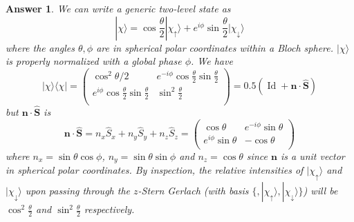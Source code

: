 \documentclass[a4paper]{article}
\DeclareMathOperator{\Id}{Id}
\newtheorem{ans}{Answer}[section]
\theoremstyle{new}
\begin{document}
\begin{ans}
We can write a generic two-level state as
$$|\chi\rangle=\cos\frac{\theta}{2}|\chi_\uparrow\rangle+e^{i\phi}\sin\frac{\theta}{2}|\chi_\downarrow\rangle$$
where the angles $\theta,\phi$ are in spherical polar coordinates within a Bloch sphere. $|\chi\rangle$ is properly normalized with a global phase $\phi$. We have
$$|\chi\rangle\langle\chi|=\begin{pmatrix}\cos^2\theta/2&e^{-i\phi}\cos\frac{\theta}{2}\sin\frac{\theta}{2}\\ e^{i\phi}\cos\frac{\theta}{2}\sin\frac{\theta}{2}&\sin^2\frac{\theta}{2}\\\end{pmatrix}=0.5(\Id+\mathbf{n}\cdot\mathbf{\hat{S}})$$
but $\mathbf{n}\cdot\mathbf{\hat{S}}$ is
$$\mathbf{n}\cdot\mathbf{\hat{S}}=n_x\hat{S}_x+n_y\hat{S}_y+n_z\hat{S}_z=\begin{pmatrix}\cos\theta&e^{-i\phi}\sin\theta\\e^{i\phi}\sin\theta&-\cos\theta\\\end{pmatrix}$$
where $n_x=\sin\theta\cos\phi$, $n_y=\sin\theta\sin\phi$ and $n_z=\cos\theta$ since $\mathbf{n}$ is a unit vector in spherical polar coordinates. By inspection, the relative intensities of $|\chi_\uparrow\rangle$ and $|\chi_\downarrow\rangle$ upon passing through the $z$-Stern Gerlach (with basis $\{,|\chi_\uparrow\rangle,|\chi_\downarrow\rangle\}$) will be $\cos^2\frac{\theta}{2}$ and $\sin^2\frac{\theta}{2}$ respectively.
\end{ans}
\end{document}
